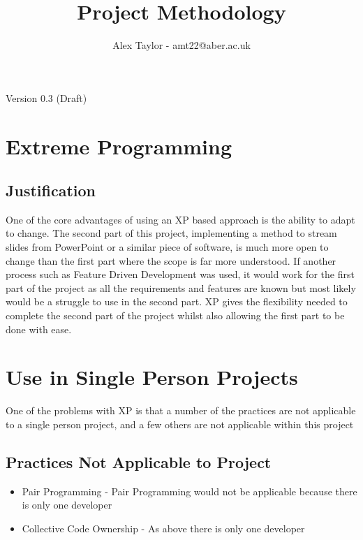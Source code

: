 \documentclass{article}
\title{Project Methodology}
\author{Alex Taylor - amt22@aber.ac.uk}
\begin{document}
\maketitle
\begin{center}
	Version 0.3 (Draft)
\end{center}
\tableofcontents
\thispagestyle{empty}
\newpage

\section{Extreme Programming}
\subsection{Justification}
One of the core advantages of using an XP based approach is the ability to adapt to change. The second part of this project, implementing a method to stream slides from PowerPoint or a similar piece of software, is much more open to change than the first part where the scope is far more understood. If another process such as Feature Driven Development was used, it would work for the first part of the project as all the requirements and features are known but most likely would be a struggle to use in the second part. XP gives the flexibility needed to complete the second part of the project whilst also allowing the first part to be done with ease.
\newpage

\section{Use in Single Person Projects}
One of the problems with XP is that a number of the practices are not applicable to a single person project, and a few others are not applicable within this project \cite{agarwal2008extreme}
\subsection{Practices Not Applicable to Project}
\begin{itemize}
	\item Pair Programming - Pair Programming would not be applicable because there is only one developer
	\item Collective Code Ownership - As above there is only one developer
\end{itemize}
\end{document}
